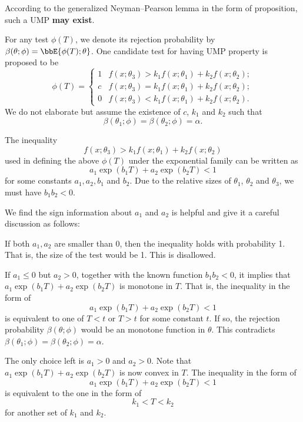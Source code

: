 According to the generalized Neyman--Pearson lemma
in the form of proposition, such a UMP {\bf may exist}.

For any test $\phi(T)$, we denote its rejection probability
by $\beta(\theta; \phi) = \bbE\{ \phi(T); \theta\}$.
One candidate test for having UMP  property is proposed to be
\[
\phi(T) =
\left \{
\begin{array}{ll}
1 & f(x; \theta_3) > k_1 f(x; \theta_1) + k_2 f(x; \theta_2);\\
c & f(x; \theta_3) =  k_1 f(x; \theta_1) + k_2 f(x; \theta_2);\\
0 & f(x; \theta_3) < k_1 f(x; \theta_1) + k_2 f(x; \theta_2).
\end{array}
\right .
\]
We do not elaborate but assume the existence of $c$, $k_1$ and $k_2$
such that 
\[
\beta(\theta_1; \phi) = \beta(\theta_2; \phi) = \alpha.
\]

The inequality
\[
f(x; \theta_3) > k_1 f(x; \theta_1) + k_2 f(x; \theta_2)
\]
used in defining the above $\phi(T)$
under the exponential family can be written as
\[
a_1 \exp( b_1 T) + a_2 \exp(b_2 T) < 1
\]
for some constants $a_1, a_2, b_1$ and $b_2$.
Due to the relative sizes of $\theta_1$, $\theta_2$
and $\theta_3$, we must have $b_1 b_2< 0$.

We find the sign information about $a_1$ and $a_2$ is
helpful and give it a careful discussion as follows:
\bi
\item
[(1)] If both $a_1, a_2$ are smaller than 0, then the inequality
holds with probability 1. That is, the size of the test would be 1.
This is disallowed.

\item
[(2)] If $a_1 \leq 0$ but $a_2 > 0$, together with the known
function $b_1b_2 < 0$,
it implies that $a_1 \exp( b_1 T) + a_2 \exp(b_2 T)$ is monotone
in $T$. That is, the inequality in the form of
\[
a_1 \exp( b_1 T) + a_2 \exp(b_2 T) < 1
\]
is equivalent to one of $T < t$ or $T > t$ for some constant $t$.
If so, the rejection probability
$\beta(\theta; \phi)$ would be an monotone function in $\theta$.
This contradicts $\beta(\theta_1; \phi) = \beta(\theta_2; \phi) = \alpha$.

\item
[(3)] The only choice left is $a_1 > 0$ and $a_2 > 0$.
Note that $a_1 \exp( b_1 T) + a_2 \exp(b_2 T)$
is now convex in $T$. The inequality in the form of
\[
a_1 \exp( b_1 T) + a_2 \exp(b_2 T) < 1
\]
is equivalent to the one in the form of
\[
k_1 < T < k_2
\]
for another set of $k_1$ and $k_2$. 
\ei

